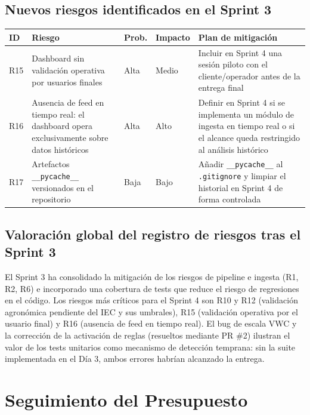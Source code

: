 \documentclass[11pt,a4paper]{article}
\begin{document}
\subsection{Nuevos riesgos identificados en el Sprint 3}

\begin{longtable}{p{} p{} p{} p{} p{}}
\textbf{ID} & \textbf{Riesgo} & \textbf{Prob.} & \textbf{Impacto} & \textbf{Plan de mitigación} \\
\hline
R15 & Dashboard sin validación operativa por usuarios finales & Alta & Medio & Incluir en Sprint 4 una sesión piloto con el cliente/operador antes de la entrega final \\
R16 & Ausencia de feed en tiempo real: el dashboard opera exclusivamente sobre datos históricos & Alta & Alto & Definir en Sprint 4 si se implementa un módulo de ingesta en tiempo real o si el alcance queda restringido al análisis histórico \\
R17 & Artefactos \texttt{\_\_pycache\_\_} versionados en el repositorio & Baja & Bajo & Añadir \texttt{\_\_pycache\_\_} al \texttt{.gitignore} y limpiar el historial en Sprint 4 de forma controlada \\
\end{longtable}

\subsection{Valoración global del registro de riesgos tras el Sprint 3}

El Sprint 3 ha consolidado la mitigación de los riesgos de pipeline e ingesta (R1, R2, R6) e
incorporado una cobertura de tests que reduce el riesgo de regresiones en el código. Los
riesgos más críticos para el Sprint 4 son R10 y R12 (validación agronómica pendiente del
IEC y sus umbrales), R15 (validación operativa por el usuario final) y R16 (ausencia de
feed en tiempo real). El bug de escala VWC y la corrección de la activación de reglas
(resueltos mediante PR \#2) ilustran el valor de los tests unitarios como mecanismo de
detección temprana: sin la suite implementada en el Día 3, ambos errores habrían alcanzado
la entrega.

\section{Seguimiento del Presupuesto}
\end{document}
